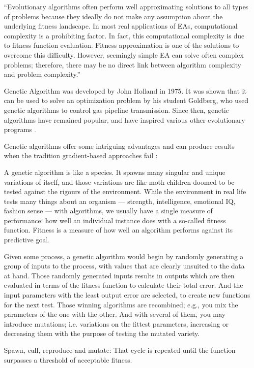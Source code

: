 ``Evolutionary algorithms often perform well approximating solutions to all types of problems because they ideally do not make any assumption about the underlying fitness landscape.  In most real applications of EAs, computational complexity is a prohibiting factor. In fact, this computational complexity is due to fitness function evaluation. Fitness approximation is one of the solutions to overcome this difficulty. However, seemingly simple EA can solve often complex problems; therefore, there may be no direct link between algorithm complexity and problem complexity.''\cite{WikipeadiaEvolutionaryAlgo2019}

Genetic Algorithm was developed by John Holland in 1975. It was shown that it can be used to solve an optimization problem by his student Goldberg, who used genetic algorithms to control gas pipeline transmission. Since then, genetic algorithms have remained popular, and have inspired various other evolutionary programs \cite{Mathur2019}.

Genetic algorithms offer some intriguing advantages and can produce results when the tradition gradient-based approaches fail \cite{Mathur2019}:

A genetic algorithm is like a species. It spawns many singular and unique variations of itself, and those variations are like moth children doomed to be tested against the rigours of the environment. While the environment in real life tests many things about an organism --- strength, intelligence, emotional IQ, fashion sense --- with algorithms, we usually have a single measure of performance: how well an individual instance does with a so-called fitness function. Fitness is a measure of how well an algorithm performs against its predictive goal. 

Given some process, a genetic algorithm would begin by randomly generating a group of inputs to the process, with values that are clearly unsuited to the data at hand. Those randomly generated inputs results in outputs which  are then evaluated in terms of the fitness function to calculate their total error. And the input parameters with the least output error are selected, to create new functions for the next test. Those winning algorithms are recombined; e.g., you mix the parameters of the one with the other. And with several of them, you may introduce mutations; i.e. variations on the fittest parameters, increasing or decreasing them with the purpose of testing the mutated variety.

Spawn, cull, reproduce and mutate: That cycle is repeated until the function surpasses a threshold of  acceptable fitness.

